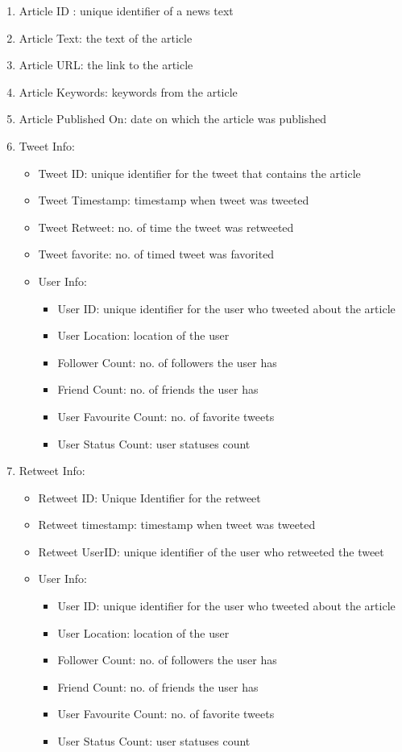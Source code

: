 \documentclass{article}
\begin{document}
\begin{enumerate}
\item Article ID : unique identifier of a news text
\item Article Text: the text of the article
\item Article URL: the link to the article
\item Article Keywords: keywords from the article
\item Article Published On: date on which the article was published
\item Tweet Info:
\begin{itemize}
\item Tweet ID: unique identifier for the tweet that contains the article
\item Tweet Timestamp: timestamp when tweet was tweeted
\item Tweet Retweet: no. of time the tweet was retweeted
\item Tweet favorite: no. of timed tweet was favorited
\item User Info:
\begin{itemize}
\item User ID: unique identifier for the user who tweeted about the article
\item User Location: location of the user
\item Follower Count: no. of followers the user has
\item Friend Count: no. of friends the user has
\item User Favourite Count: no. of favorite tweets
\item User Status Count: user statuses count
\end{itemize}
\end{itemize}
\item Retweet Info:
\begin{itemize}
\item Retweet ID: Unique Identifier for the retweet
\item Retweet timestamp: timestamp when tweet was tweeted
\item Retweet UserID: unique identifier of the user who retweeted the tweet
\item User Info:
\begin{itemize}
\item User ID: unique identifier for the user who tweeted about the article
\item User Location: location of the user
\item Follower Count: no. of followers the user has
\item Friend Count: no. of friends the user has
\item User Favourite Count: no. of favorite tweets
\item User Status Count: user statuses count
\end{itemize}
\end{itemize}
\end{enumerate}
\end{document}
